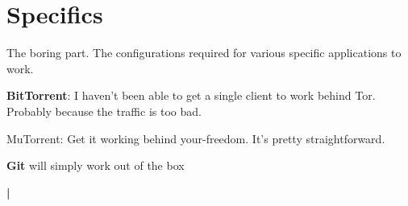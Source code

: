 \section{Specifics}
The boring part. The configurations required for various specific applications to work.
\item \textbf{BitTorrent}: I haven't been able to get a single client to work behind Tor. Probably because the traffic is too bad.
\begin{innerlist}
\item MuTorrent: Get it working behind your-freedom. It's pretty straightforward.
\end{innerlist}
\item \textbf{Git} will simply work out of the box
\item \textbf|

